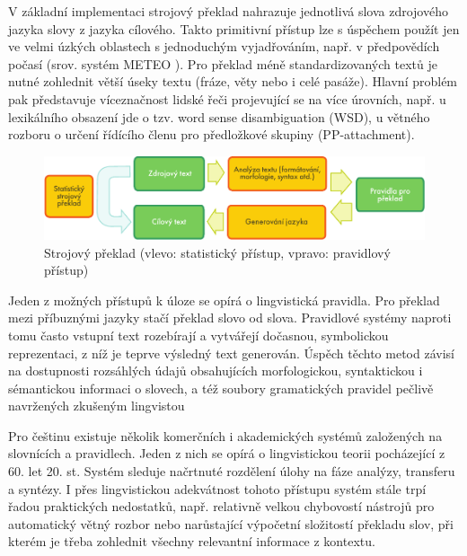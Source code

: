 \begin{multicols}{2}
V základní implementaci strojový překlad nahrazuje jednotlivá slova zdrojového jazyka slovy z jazyka cílového. Takto primitivní přístup lze s úspěchem použít jen ve velmi úzkých oblastech s jednoduchým vyjadřováním, např. v předpovědích počasí (srov. systém METEO \cite{Note19}). Pro překlad méně standardizovaných textů je nutné zohlednit větší úseky textu (fráze, věty nebo i celé pasáže). Hlavní problém pak představuje víceznačnost lidské řeči projevující se na více úrovních, např. u lexikálního obsazení jde o tzv. word sense disambiguation (WSD), u větného rozboru o určení řídícího členu pro předložkové skupiny (PP-attachment).
\begin{figure}[htb]
  \center
  \includegraphics[width=\textwidth]{../_media/czech/machine_translation}
  \caption{Strojový překlad (vlevo: statistický přístup, vpravo: pravidlový přístup)}
  \label{fig:mtarch_cz}
\end{figure}
Jeden z možných přístupů k úloze se opírá o lingvistická pravidla. Pro překlad mezi příbuznými jazyky stačí překlad slovo od slova. Pravidlové systémy naproti tomu často vstupní text rozebírají a vytvářejí dočasnou, symbolickou reprezentaci, z níž je teprve výsledný text generován. Úspěch těchto metod závisí na dostupnosti rozsáhlých údajů obsahujících morfologickou, syntaktickou i sémantickou informaci o slovech, a též soubory gramatických pravidel pečlivě navržených zkušeným lingvistou

Pro češtinu existuje několik komerčních i akademických systémů založených na slovnících a pravidlech. Jeden z nich se opírá o lingvistickou teorii pocházející z 60. let 20. st. Systém sleduje načrtnuté rozdělení úlohy na fáze analýzy, transferu a syntézy. I přes lingvistickou adekvátnost tohoto přístupu systém stále trpí řadou praktických nedostatků, např. relativně velkou chybovostí nástrojů pro automatický větný rozbor nebo narůstající výpočetní složitostí překladu slov, při kterém je třeba zohlednit všechny relevantní informace z kontextu.


\end{multicols}
